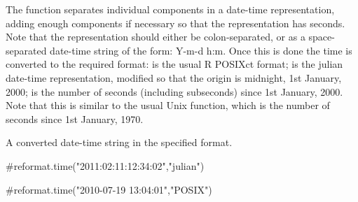 \documentclass[a4paper]{book}
\begin{document}
%
\begin{Details}\relax
The function separates individual components in a date-time representation, adding enough components if necessary so that the representation has seconds.
Note that the representation should either be colon-separated, or as a space-separated date-time string of the form: Y-m-d h:m.  Once this is done the time
is converted to the required format:  is the usual R POSIXct format;  is the julian date-time representation, modified so that the origin is midnight, 1st January, 2000;  is the number of seconds (including subseconds) since 1st January, 2000.  Note that this is similar to the usual Unix  function, which is the number of seconds since 1st January, 1970.
\end{Details}
%
\begin{Value}
A converted date-time string in the specified format.
\end{Value}
%
\begin{Examples}
\begin{ExampleCode}

#reformat.time("2011:02:11:12:34:02","julian")

#reformat.time("2010-07-19 13:04:01","POSIX")

\end{ExampleCode}
\end{Examples}
\printindex{}
\end{document}
